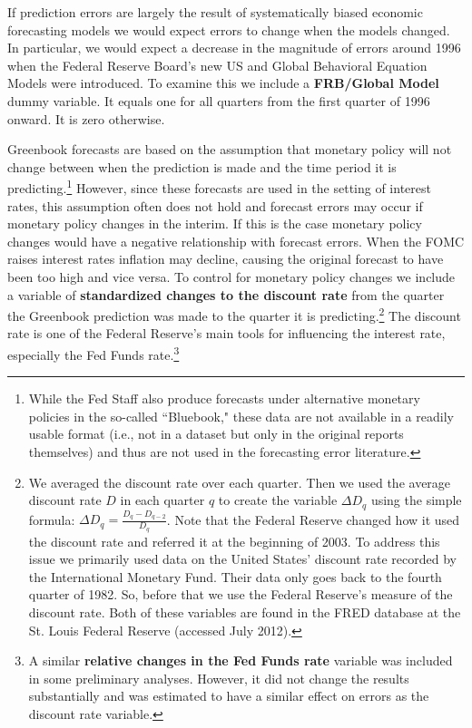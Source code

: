 \documentclass[a4paper]{article}\usepackage{graphicx, color}
\begin{document}
If prediction errors are largely the result of systematically biased economic forecasting models we would expect errors to change when the models changed. In particular, we would expect a decrease in the magnitude of errors around 1996 when the Federal Reserve Board's new US and Global Behavioral Equation Models were introduced. To examine this we include a {\bf{FRB/Global Model}} dummy variable. It equals one for all quarters from the first quarter of 1996 onward. It is zero otherwise.

Greenbook forecasts are based on the assumption that monetary policy will not change between when the prediction is made and the time period it is predicting.\footnote{While the Fed Staff also produce forecasts under alternative monetary policies in the so-called ``Bluebook," these data are not available in a readily usable format (i.e., not in a dataset but only in the original reports themselves) and thus are not used in the forecasting error literature.} However, since these forecasts are used in the setting of interest rates, this assumption often does not hold and forecast errors may occur if monetary policy changes in the interim. If this is the case monetary policy changes would have a negative relationship with forecast errors. When the FOMC raises interest rates inflation may decline, causing the original forecast to have been too high and vice versa. To control for monetary policy changes we include a variable of {\bf{standardized changes to the discount rate}} from the quarter the Greenbook prediction was made to the quarter it is predicting.\footnote{We averaged the discount rate over each quarter. Then we used the average discount rate $D$ in each quarter $q$ to create the variable $\Delta D_{q}$ using the simple formula: $\Delta D_{q} = \frac{D_{q} - D_{q-2}}{D_{q}}$. Note that the Federal Reserve changed how it used the discount rate and referred it at the beginning of 2003. To address this issue we primarily used data on the United States' discount rate recorded by the International Monetary Fund. Their data only goes back to the fourth quarter of 1982. So, before that we use the Federal Reserve's measure of the discount rate. Both of these variables are found in the FRED database at the St. Louis Federal Reserve (accessed July 2012). } The discount rate is one of the Federal Reserve's main tools for influencing the interest rate, especially the Fed Funds rate.\footnote{A similar {\bf{relative changes in the Fed Funds rate}} variable was included in some preliminary analyses. However, it did not change the results substantially and was estimated to have a similar effect on errors as the discount rate variable.}
\end{document}
